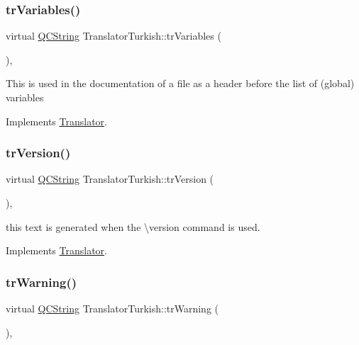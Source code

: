 \mbox{\label{class_translator_turkish_a10c8e15096fad20f29378f26efd253bf}} 
\subsubsection{\texorpdfstring{trVariables()}{trVariables()}}
{\footnotesize\ttfamily virtual \mbox{\hyperlink{class_q_c_string}{Q\+C\+String}} Translator\+Turkish\+::tr\+Variables (\begin{DoxyParamCaption}{ }\end{DoxyParamCaption})\hspace{0.3cm}{\ttfamily [inline]}, {\ttfamily [virtual]}}

This is used in the documentation of a file as a header before the list of (global) variables 

Implements \mbox{\hyperlink{class_translator}{Translator}}.

\mbox{\label{class_translator_turkish_a26fb117af9d2c470ce0b18a49cb86c97}} 
\subsubsection{\texorpdfstring{trVersion()}{trVersion()}}
{\footnotesize\ttfamily virtual \mbox{\hyperlink{class_q_c_string}{Q\+C\+String}} Translator\+Turkish\+::tr\+Version (\begin{DoxyParamCaption}{ }\end{DoxyParamCaption})\hspace{0.3cm}{\ttfamily [inline]}, {\ttfamily [virtual]}}

this text is generated when the \textbackslash{}version command is used. 

Implements \mbox{\hyperlink{class_translator}{Translator}}.

\mbox{\label{class_translator_turkish_affc98f5569dd0e86c15a71a7658aee32}} 
\subsubsection{\texorpdfstring{trWarning()}{trWarning()}}
{\footnotesize\ttfamily virtual \mbox{\hyperlink{class_q_c_string}{Q\+C\+String}} Translator\+Turkish\+::tr\+Warning (\begin{DoxyParamCaption}{ }\end{DoxyParamCaption})\hspace{0.3cm}{\ttfamily [inline]}, {\ttfamily [virtual]}}

